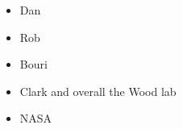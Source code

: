 \begin{itemize}
    \item Dan
    \item Rob
    \item Bouri
    \item Clark and overall the Wood lab
    \item NASA
\end{itemize}